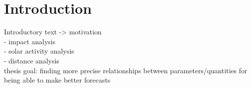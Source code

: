 
\chapter{Introduction}
\label{chap:introduction}


Introductory text -> motivation\\
- \Kp{} impact analysis\\
- solar activity analysis\\
- distance analysis\\



thesis goal: finding more precise relationships between parameters/quantities for being able to make better forecasts\\

